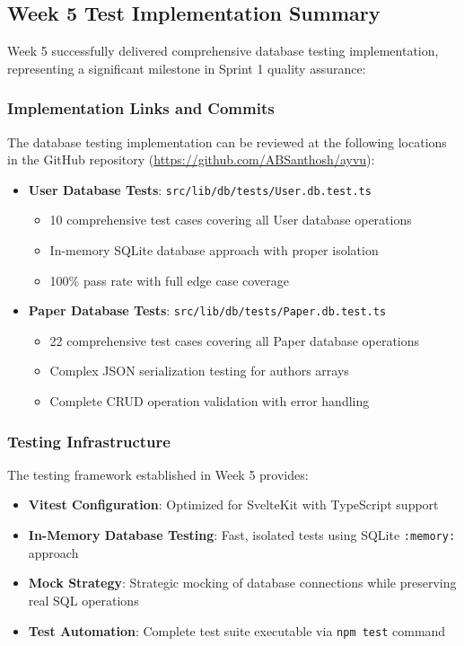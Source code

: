 \documentclass[12pt]{article}
\begin{document}
\subsection{Week 5 Test Implementation Summary}

Week 5 successfully delivered comprehensive database testing implementation, representing a significant milestone in Sprint 1 quality assurance:

\subsubsection{Implementation Links and Commits}
The database testing implementation can be reviewed at the following locations in the GitHub repository (\url{https://github.com/ABSanthosh/ayvu}):

\begin{itemize}
  \item \textbf{User Database Tests}: \texttt{src/lib/db/tests/User.db.test.ts}
    \begin{itemize}
      \item 10 comprehensive test cases covering all User database operations
      \item In-memory SQLite database approach with proper isolation
      \item 100\% pass rate with full edge case coverage
    \end{itemize}
  
  \item \textbf{Paper Database Tests}: \texttt{src/lib/db/tests/Paper.db.test.ts}  
    \begin{itemize}
      \item 22 comprehensive test cases covering all Paper database operations
      \item Complex JSON serialization testing for authors arrays
      \item Complete CRUD operation validation with error handling
    \end{itemize}
\end{itemize}

\subsubsection{Testing Infrastructure}
The testing framework established in Week 5 provides:

\begin{itemize}
  \item \textbf{Vitest Configuration}: Optimized for SvelteKit with TypeScript support
  \item \textbf{In-Memory Database Testing}: Fast, isolated tests using SQLite \texttt{:memory:} approach
  \item \textbf{Mock Strategy}: Strategic mocking of database connections while preserving real SQL operations
  \item \textbf{Test Automation}: Complete test suite executable via \texttt{npm test} command
\end{itemize}
\end{document}
